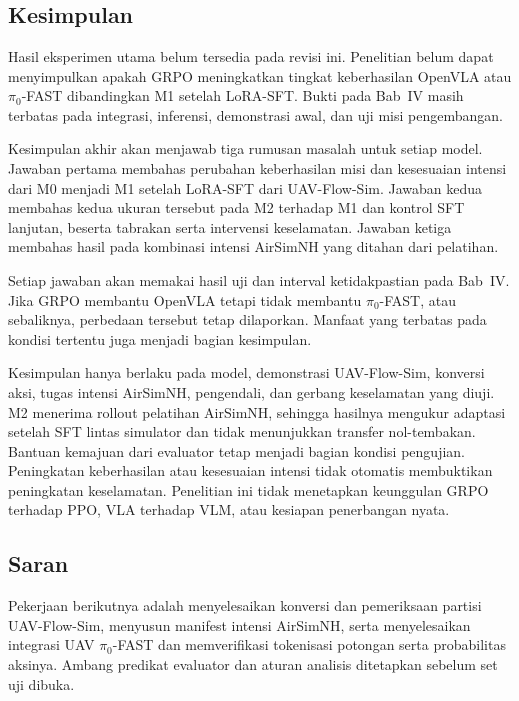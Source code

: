 \chapter{\babLima}
\label{cha:penutup}
\section{Kesimpulan}
\label{sec:kesimpulan}
Hasil eksperimen utama belum tersedia pada revisi ini. Penelitian belum dapat menyimpulkan apakah GRPO meningkatkan tingkat keberhasilan OpenVLA atau $\pi_0$-FAST dibandingkan M1 setelah LoRA-SFT. Bukti pada Bab~IV masih terbatas pada integrasi, inferensi, demonstrasi awal, dan uji misi pengembangan.

Kesimpulan akhir akan menjawab tiga rumusan masalah untuk setiap model. Jawaban pertama membahas perubahan keberhasilan misi dan kesesuaian intensi dari M0 menjadi M1 setelah LoRA-SFT dari UAV-Flow-Sim. Jawaban kedua membahas kedua ukuran tersebut pada M2 terhadap M1 dan kontrol SFT lanjutan, beserta tabrakan serta intervensi keselamatan. Jawaban ketiga membahas hasil pada kombinasi intensi AirSimNH yang ditahan dari pelatihan.

Setiap jawaban akan memakai hasil uji dan interval ketidakpastian pada Bab~IV. Jika GRPO membantu OpenVLA tetapi tidak membantu $\pi_0$-FAST, atau sebaliknya, perbedaan tersebut tetap dilaporkan. Manfaat yang terbatas pada kondisi tertentu juga menjadi bagian kesimpulan.

Kesimpulan hanya berlaku pada model, demonstrasi UAV-Flow-Sim, konversi aksi, tugas intensi AirSimNH, pengendali, dan gerbang keselamatan yang diuji. M2 menerima rollout pelatihan AirSimNH, sehingga hasilnya mengukur adaptasi setelah SFT lintas simulator dan tidak menunjukkan transfer nol-tembakan. Bantuan kemajuan dari evaluator tetap menjadi bagian kondisi pengujian. Peningkatan keberhasilan atau kesesuaian intensi tidak otomatis membuktikan peningkatan keselamatan. Penelitian ini tidak menetapkan keunggulan GRPO terhadap PPO, VLA terhadap VLM, atau kesiapan penerbangan nyata.

\section{Saran}
\label{sec:saran}
Pekerjaan berikutnya adalah menyelesaikan konversi dan pemeriksaan partisi UAV-Flow-Sim, menyusun manifest intensi AirSimNH, serta menyelesaikan integrasi UAV $\pi_0$-FAST dan memverifikasi tokenisasi potongan serta probabilitas aksinya. Ambang predikat evaluator dan aturan analisis ditetapkan sebelum set uji dibuka.

